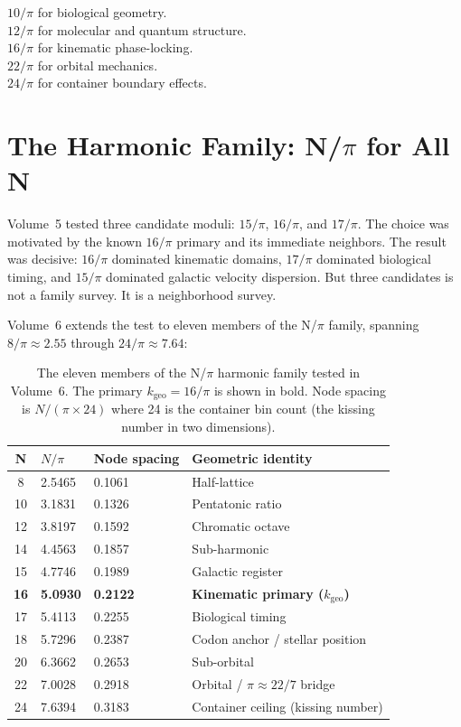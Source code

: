 \documentclass[11pt, letterpaper, openany]{book}
\begin{document}
$10/\pi$ for biological geometry.\\
$12/\pi$ for molecular and quantum structure.\\
$16/\pi$ for kinematic phase-locking.\\
$22/\pi$ for orbital mechanics.\\
$24/\pi$ for container boundary effects.

\chapter{The Harmonic Family: N/$\pi$ for All N}

Volume~5 tested three candidate moduli: $15/\pi$, $16/\pi$, and $17/\pi$.
The choice was motivated by the known $16/\pi$ primary and its immediate neighbors.
The result was decisive: $16/\pi$ dominated kinematic domains, $17/\pi$ dominated biological timing, and $15/\pi$ dominated galactic velocity dispersion.
But three candidates is not a family survey. It is a neighborhood survey.

Volume~6 extends the test to eleven members of the N/$\pi$ family, spanning $8/\pi \approx 2.55$ through $24/\pi \approx 7.64$:

\begin{table}[H]
\centering
\renewcommand{\arraystretch}{1.4}
\begin{tabular}{|c|l|l|l|}
\hline
\textbf{N} & \textbf{$N/\pi$} & \textbf{Node spacing} & \textbf{Geometric identity} \\
\hline\hline
8  & 2.5465 & 0.1061 & Half-lattice \\
10 & 3.1831 & 0.1326 & Pentatonic ratio \\
12 & 3.8197 & 0.1592 & Chromatic octave \\
14 & 4.4563 & 0.1857 & Sub-harmonic \\
15 & 4.7746 & 0.1989 & Galactic register \\
\textbf{16} & \textbf{5.0930} & \textbf{0.2122} & \textbf{Kinematic primary ($k_\text{geo}$)} \\
17 & 5.4113 & 0.2255 & Biological timing \\
18 & 5.7296 & 0.2387 & Codon anchor / stellar position \\
20 & 6.3662 & 0.2653 & Sub-orbital \\
22 & 7.0028 & 0.2918 & Orbital / $\pi \approx 22/7$ bridge \\
24 & 7.6394 & 0.3183 & Container ceiling (kissing number) \\
\hline
\end{tabular}
\caption{The eleven members of the N/$\pi$ harmonic family tested in Volume~6.
The primary $k_\text{geo} = 16/\pi$ is shown in bold. Node spacing is $N/(\pi \times 24)$
where 24 is the container bin count (the kissing number in two dimensions).}
\label{tab:harmonic_family}
\end{table}
\end{document}
